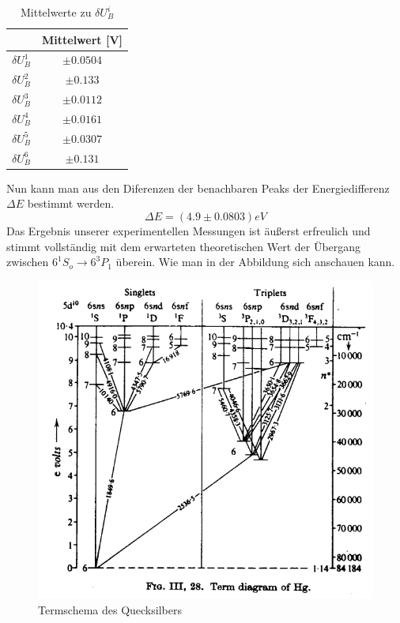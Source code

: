 \documentclass{article}
\begin{document}
\begin{multicols}{2}
\begin{table}[H]
  \centering
  \begin{tabular}{cc} 
      \hline
       & Mittelwert [V] \\ \hline
      $\delta U^1_B$ & $\pm 0.0504$ \\ \hline
      $\delta U^2_B$ & $\pm 0.133$ \\ \hline
      $\delta U^3_B$ & $\pm 0.0112$ \\ \hline
      $\delta U^4_B$ & $\pm 0.0161$ \\ \hline
      $\delta U^5_B$ & $\pm 0.0307$ \\ \hline
      $\delta U^6_B$ & $\pm 0.131$ \\ \hline
  \end{tabular}
  \caption{Mittelwerte zu $\delta U^i_B$}
  \label{tab:mean_values}
\end{table}
Nun kann man aus den Diferenzen der benachbaren Peaks der Energiedifferenz $\Delta E$ bestimmt werden. 
\begin{equation*}
  \Delta E=(4.9 \pm 0.0803)eV
\end{equation*}
Das Ergebnis unserer experimentellen Messungen ist äußerst erfreulich und stimmt vollständig 
mit dem erwarteten theoretischen Wert der Übergang zwischen $6^1 S_o \rightarrow 6^3P_1$ überein. 
Wie man in der Abbildung sich anschauen kann. 
\begin{figure}[H]
  \centering
  \includegraphics[scale=0.45]{Vereinfachtes Hg-Termschema.png}
  \caption{Termschema des Quecksilbers}
\end{figure}

\end{multicols}
\end{document}
